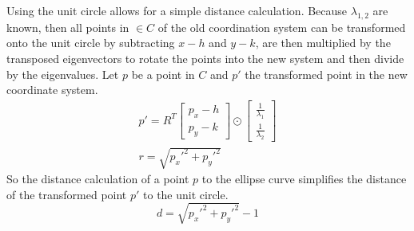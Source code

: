 Using the unit circle allows for a simple distance calculation. Because $\lambda_{1,2}$ are known, then all points in $\in C$ of the old coordination system can be transformed onto the unit circle by subtracting $x-h$ and $y-k$, are then multiplied by the transposed eigenvectors to rotate the points into the new system and then divide by the eigenvalues. Let $p$ be a point in $C$ and $p'$ the transformed point in the new coordinate system. 
\begin{align}
    p' = R^T \begin{bmatrix} p_x - h \\ p_y - k \end{bmatrix} \odot \begin{bmatrix} \frac{1}{\lambda_1} \\ \frac{1}{\lambda_2} \end{bmatrix}\\
    r = \sqrt{p_x'^2 + p_y'^2}
    \label{distance calculation}
\end{align}
So the distance calculation of a point $p$ to the ellipse curve simplifies the distance of the transformed point $p'$ to the unit circle.
\begin{equation}
    d = \sqrt{p_x'^2 + p_y'^2} -1
\end{equation}

